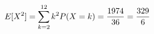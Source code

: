 \documentclass[preview]{standalone}
\begin{document}
\begin{align*}
\special{dvisvgm:raw <g id='unique000'>}E[X^2]=\displaystyle\sum_{k=2}^{12}k^2P(X=k)=\dfrac{1974}{36}=\dfrac{329}{6}\special{dvisvgm:raw </g>}
\end{align*}
\end{document}
